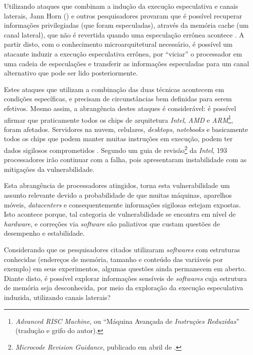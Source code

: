 \documentclass[
	article,			    %
	12pt,				    %
	oneside,			    %
	a4paper,			    %
	chapter=TITLE,		    %
	section=TITLE,		    %
	subsection=TITLE,	    %
	english,			    %
	brazil,				    %
	sumario=tradicional
]{abntex2}
\begin{document}
Utilizando ataques que combinam a indução da execução especulativa e canais laterais, Jann Horn (\citeyear{Jann2018Reading}) e outros pesquisadores provaram que é possível recuperar informações privilegiadas (que foram especuladas), através da memória cache (um canal lateral), que não é revertida quando uma especulação errônea acontece \cite{Kocher2018Spectre}. A partir disto, com o conhecimento microarquitetural necessário, é possível um atacante induzir a execução especulativa errônea, por ``viciar'' o processador em uma cadeia de especulações e transferir as informações especuladas para um canal alternativo que pode ser lido posteriormente.

Estes ataques que utilizam a combinação das duas técnicas acontecem em condições específicas, e precisam de circunstâncias bem definidas para serem efetivos. Mesmo assim, a abrangência destes ataques é considerável: é possível afirmar que praticamente todos os chips de arquitetura \emph{Intel}, \emph{AMD} e \emph{ARM}\footnote{\emph{Advanced RISC Machine}, ou ``Máquina Avançada de \emph{Instruções Reduzidas}'' (tradução e grifo do autor).}, foram afetados. Servidores na nuvem, celulares, \emph{desktops}, \emph{notebooks} e basicamente todos os chips que podem manter muitas instruções em execução, podem ter dados sigilosos comprometidos \cite{Graz2018Meltdown}. Segundo um guia de revisão\footnote{\emph{Microcode Revision Guidance}, publicado em abril de \citeyear{Intel2018Microcode}.} da \emph{Intel}, 193 processadores irão continuar com a falha, pois apresentaram instabilidade com as mitigações da vulnerabilidade.

Esta abrangência de processadores atingidos, torna esta vulnerabilidade um assunto relevante devido a probabilidade de que muitas máquinas, aparelhos móveis, \emph{datacenters} e consequentemente informações sigilosas estejam expostas. Isto acontece porque, tal categoria de vulnerabilidade se encontra em nível de \emph{hardware}, e correções via \emph{software} são paliativos que custam questões de desempenho e estabilidade.

Considerando que os pesquisadores citados utilizaram \emph{softwares} com estruturas conhecidas (endereços de memória, tamanho e conteúdo das variáveis por exemplo) em seus experimentos, algumas questões ainda permanecem em aberto. Diante disto, é possível explorar informações sensíveis de \emph{softwares} cuja estrutura de memória seja desconhecida, por meio da exploração da execução especulativa induzida, utilizando canais laterais?
\end{document}
